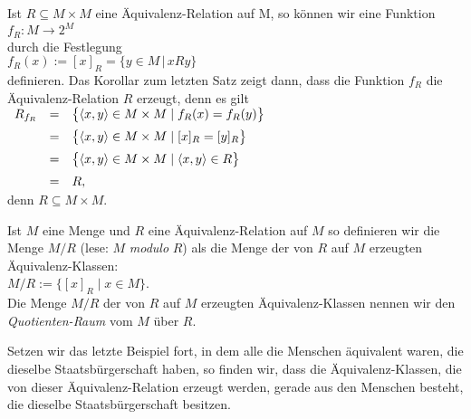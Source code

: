 \remark
Ist $R \subseteq M \times M$ eine \"{A}quivalenz-Relation auf M, so k\"{o}nnen wir eine Funktion
\\[0.2cm]
\hspace*{1.3cm}
$f_R : M \rightarrow 2^M$
\\[0.2cm]
durch die Festlegung
\\[0.2cm]
\hspace*{1.3cm}
$f_R(x) := [x]_R = \bigl\{ y \in M \,|\, x R y \bigr\}$
\\[0.2cm]
definieren.   Das Korollar zum letzten Satz zeigt dann, dass die Funktion $f_R$ die \"{A}quivalenz-Relation
$R$ erzeugt, denn es gilt
\\[0.2cm]
\hspace*{1.3cm}
$
\begin{array}[t]{lcl}
R_{f_R} & = & \bigl\{ \pair(x, y) \in M \times M \mid f_R(x) = f_R(y)  \bigr\}  \\[0.2cm]
        & = & \bigl\{ \pair(x, y) \in M \times M \mid [x]_R = [y]_R    \bigr\}  \\[0.2cm]
        & = & \bigl\{ \pair(x, y) \in M \times M \mid \pair(x,y) \in R \bigr\}  \\[0.2cm]
        & = & R,
\end{array}
$
\\[0.2cm]
denn  $R \subseteq M \times M$. \eox


\begin{Definition}
Ist $M$ eine Menge und $R$ eine \"{A}quivalenz-Relation auf $M$ so definieren wir die Menge $M/R$ (lese:
$M$ \emph{modulo} $R$) als die Menge der von $R$ auf $M$ erzeugten \"{A}quivalenz-Klassen:
\\[0.2cm]
\hspace*{1.3cm}
$M/R := \bigl\{ [x]_R \mid x \in M \bigr\}$.
\\[0.2cm]
Die Menge $M/R$ der von $R$ auf $M$ erzeugten \"{A}quivalenz-Klassen nennen wir den
\emph{Quotienten-Raum} vom $M$ \"{u}ber $R$.  \eox
\end{Definition}

\example
Setzen wir das letzte Beispiel fort, in dem alle die Menschen \"{a}quivalent waren, die dieselbe
Staatsb\"{u}rgerschaft haben, so finden wir, dass die \"{A}quivalenz-Klassen, die von dieser
\"{A}quivalenz-Relation erzeugt werden, gerade aus den Menschen besteht, die dieselbe
Staatsb\"{u}rgerschaft besitzen.  \eox


